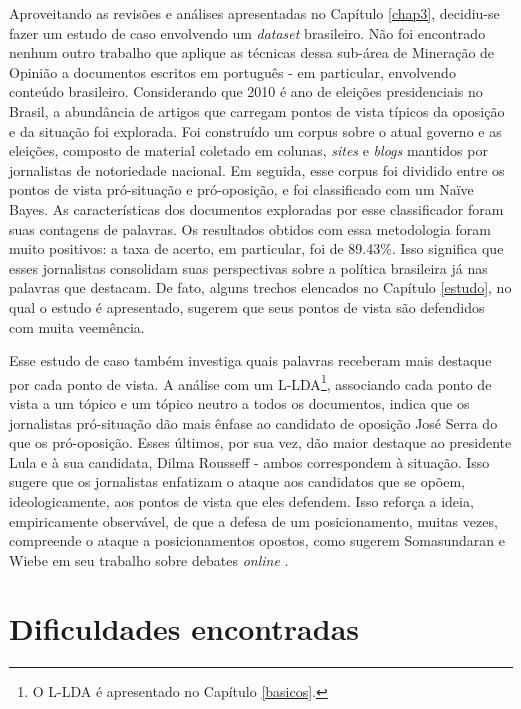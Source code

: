 Aproveitando as revisões e análises apresentadas no Capítulo \ref{chap3}, decidiu-se fazer um estudo de caso envolvendo um \emph{dataset} brasileiro. Não foi encontrado nenhum outro trabalho que aplique as técnicas dessa sub-área de Mineração de Opinião a documentos escritos em português - em particular, envolvendo conteúdo brasileiro. Considerando que 2010 é ano de eleições presidenciais no Brasil, a abundância de artigos que carregam pontos de vista típicos da oposição e da situação foi explorada. Foi construído um corpus sobre o atual governo e as eleições, composto de material coletado em colunas, \emph{sites} e \emph{blogs} mantidos por jornalistas de notoriedade nacional. Em seguida, esse corpus foi dividido entre os pontos de vista pró-situação e pró-oposição, e foi classificado com um Naïve Bayes. As características dos documentos exploradas por esse classificador foram suas contagens de palavras. Os resultados obtidos com essa metodologia foram muito positivos: a taxa de acerto, em particular, foi de 89.43\%. Isso significa que esses jornalistas consolidam suas perspectivas sobre a política brasileira já nas palavras que destacam. De fato, alguns trechos elencados no Capítulo \ref{estudo}, no qual o estudo é apresentado, sugerem que seus pontos de vista são defendidos com muita veemência. 

Esse estudo de caso também investiga quais palavras receberam mais destaque por cada ponto de vista. A análise com um L-LDA\footnote{O L-LDA é apresentado no Capítulo \ref{basicos}.}, associando cada ponto de vista a um tópico e um tópico neutro a todos os documentos, indica que os jornalistas pró-situação dão mais ênfase ao candidato de oposição José Serra do que os pró-oposição. Esses últimos, por sua vez, dão maior destaque ao presidente Lula e à sua candidata, Dilma Rousseff - ambos correspondem à situação. Isso sugere que os jornalistas enfatizam o ataque aos candidatos que se opõem, ideologicamente, aos pontos de vista que eles defendem. Isso reforça a ideia, empiricamente observável, de que a defesa de um posicionamento, muitas vezes, compreende o ataque a posicionamentos opostos, como sugerem Somasundaran e Wiebe em seu trabalho sobre debates \emph{online} \cite{wiebe}.  

\section{Dificuldades encontradas}

